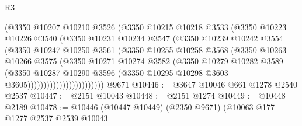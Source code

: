 \begin{lexlean}{R3}
\begin{coremodule}
                            (@3350
                              @10207
                              @10210
                              @3526
                              (@3350
                                @10215
                                @10218
                                @3533
                                (@3350
                                  @10223
                                  @10226
                                  @3540
                                  (@3350
                                    @10231
                                    @10234
                                    @3547
                                    (@3350
                                      @10239
                                      @10242
                                      @3554
                                      (@3350
                                        @10247
                                        @10250
                                        @3561
                                        (@3350
                                          @10255
                                          @10258
                                          @3568
                                          (@3350
                                            @10263
                                            @10266
                                            @3575
                                            (@3350
                                              @10271
                                              @10274
                                              @3582
                                              (@3350
                                                @10279
                                                @10282
                                                @3589
                                                (@3350
                                                  @10287
                                                  @10290
                                                  @3596
                                                  (@3350
                                                    @10295
                                                    @10298
                                                    @3603
                                                    @3605))))))))))))))))))))))))
    @9671
@10446 := @3647 @10046 @661 @1278 @2540 @2537
@10447 := @2151 @10043
@10448 := @2151 @1274
@10449 := @10448 @2189
@10478 := @10446
    (@10447 @10449)
    (@2350 @9671)
    (@10063
      @177
      @1277
      @2537
      @2539
      @10043

\end{coremodule}
\end{lexlean}
